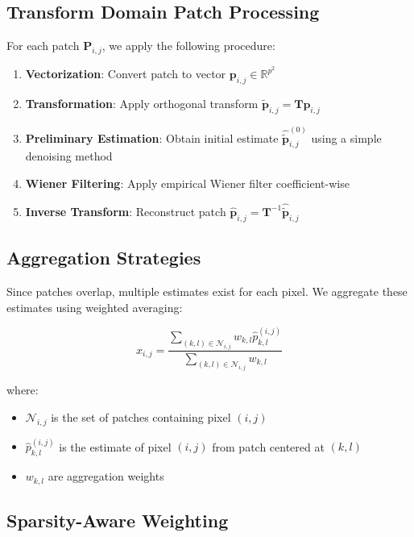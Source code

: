 \documentclass[12pt]{article}
\renewcommand{\vec}[1]{\mathbf{#1}}
\theoremstyle{definition}
\begin{document}
\subsection{Transform Domain Patch Processing}
\label{subsec:transform_patch}

For each patch $\mathbf{P}_{i,j}$, we apply the following procedure:

\begin{enumerate}[leftmargin=*]
    \item \textbf{Vectorization}: Convert patch to vector $\vec{p}_{i,j} \in \mathbb{R}^{p^2}$
    \item \textbf{Transformation}: Apply orthogonal transform $\tilde{\vec{p}}_{i,j} = \mathbf{T}\vec{p}_{i,j}$
    \item \textbf{Preliminary Estimation}: Obtain initial estimate $\hat{\tilde{\vec{p}}}_{i,j}^{(0)}$ using a simple denoising method
    \item \textbf{Wiener Filtering}: Apply empirical Wiener filter coefficient-wise
    \item \textbf{Inverse Transform}: Reconstruct patch $\hat{\vec{p}}_{i,j} = \mathbf{T}^{-1}\hat{\tilde{\vec{p}}}_{i,j}$
\end{enumerate}

\subsection{Aggregation Strategies}
\label{subsec:aggregation}

Since patches overlap, multiple estimates exist for each pixel. We aggregate these estimates using weighted averaging:

\begin{equation}
    \label{eq:aggregation}
    \hat{x}_{i,j} = \frac{\sum_{(k,l) \in \mathcal{N}_{i,j}} w_{k,l} \hat{p}_{k,l}^{(i,j)}}{\sum_{(k,l) \in \mathcal{N}_{i,j}} w_{k,l}}
\end{equation}

where:
\begin{itemize}[leftmargin=*]
    \item $\mathcal{N}_{i,j}$ is the set of patches containing pixel $(i,j)$
    \item $\hat{p}_{k,l}^{(i,j)}$ is the estimate of pixel $(i,j)$ from patch centered at $(k,l)$
    \item $w_{k,l}$ are aggregation weights
\end{itemize}

\subsection{Sparsity-Aware Weighting}
\label{subsec:sparsity_aware}
\end{document}
